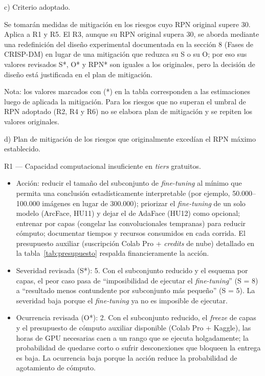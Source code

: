 \documentclass[
  11pt, %
]{charter}
\begin{document}
c) Criterio adoptado.

Se tomarán medidas de mitigación en los riesgos cuyo RPN original supere 30. Aplica a R1 y R5. El R3, aunque su RPN original supera 30, se aborda mediante una redefinición del diseño experimental documentada en la sección 8 (Fases de CRISP-DM) en lugar de una mitigación que reduzca su S o su O; por eso sus valores revisados S*, O* y RPN* son iguales a los originales, pero la decisión de diseño está justificada en el plan de mitigación.

Nota: los valores marcados con (*) en la tabla corresponden a las estimaciones luego de aplicada la mitigación. Para los riesgos que no superan el umbral de RPN adoptado (R2, R4 y R6) no se elabora plan de mitigación y se repiten los valores originales.

d) Plan de mitigación de los riesgos que originalmente excedían el RPN máximo establecido.

R1 --- Capacidad computacional insuficiente en \textit{tiers} gratuitos.

\begin{itemize}
\item Acción: reducir el tamaño del subconjunto de \textit{fine-tuning} al mínimo que permita una conclusión estadísticamente interpretable (por ejemplo, 50.000--100.000 imágenes en lugar de 300.000); priorizar el \textit{fine-tuning} de un solo modelo (ArcFace, HU11) y dejar el de AdaFace (HU12) como opcional; entrenar por capas (congelar las convolucionales tempranas) para reducir cómputo; documentar tiempos y recursos consumidos en cada corrida. El presupuesto auxiliar (suscripción Colab Pro + \textit{credits} de nube) detallado en la tabla~\ref{tab:presupuesto} respalda financieramente la acción.
\item Severidad revisada (S*): 5. Con el subconjunto reducido y el esquema por capas, el peor caso pasa de ``imposibilidad de ejecutar el \textit{fine-tuning}'' (S = 8) a ``resultado menos contundente por subconjunto más pequeño'' (S = 5). La severidad baja porque el \textit{fine-tuning} ya no es imposible de ejecutar.
\item Ocurrencia revisada (O*): 2. Con el subconjunto reducido, el \textit{freeze} de capas y el presupuesto de cómputo auxiliar disponible (Colab Pro + Kaggle), las horas de GPU necesarias caen a un rango que se ejecuta holgadamente; la probabilidad de quedarse corto o sufrir desconexiones que bloqueen la entrega es baja. La ocurrencia baja porque la acción reduce la probabilidad de agotamiento de cómputo.
\end{itemize}
\end{document}
